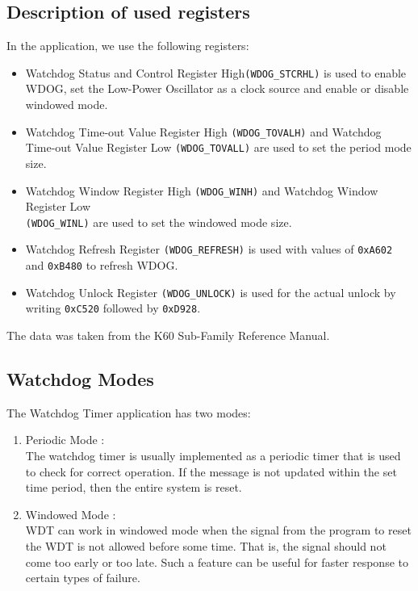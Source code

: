 \documentclass[a4paper, 12pt]{article}
\begin{document}
\subsection{Description of used registers}
In the application, we use the following registers: 
\begin{itemize}
\item Watchdog Status and Control Register High\verb|(WDOG_STCRHL)| is used to enable WDOG, set the Low-Power Oscillator as a clock source and enable or disable windowed mode.
\item Watchdog Time-out Value Register High \verb|(WDOG_TOVALH)| and Watchdog Time-out Value Register Low \verb|(WDOG_TOVALL)| are used to set the period mode size.
\item Watchdog Window Register High \verb|(WDOG_WINH)| and  Watchdog Window Register Low \\
\verb|(WDOG_WINL)| are used to set the windowed mode size.
\item Watchdog Refresh Register \verb|(WDOG_REFRESH)| is used with values of \verb|0xA602| and \verb|0xB480| to refresh WDOG.
\item Watchdog Unlock Register \verb|(WDOG_UNLOCK)| is used for the actual unlock  by writing \verb|0xC520| followed by \verb|0xD928|.
\end{itemize}
The data was taken from the K60 Sub-Family Reference Manual.
\subsection{Watchdog Modes}
The Watchdog Timer application has two modes:
\begin{enumerate}
    \item Periodic Mode : \\
  The watchdog timer is usually implemented as a periodic timer that is used to check for correct operation. If the message is not updated within the set time period, then the entire system is reset.
\item Windowed Mode :\\
WDT can work in windowed mode when the signal from the program to reset the WDT is not allowed before some time. That is, the signal should not come too early or too late. Such a feature can be useful for faster response to certain types of failure.
\end{enumerate}
\end{document}
